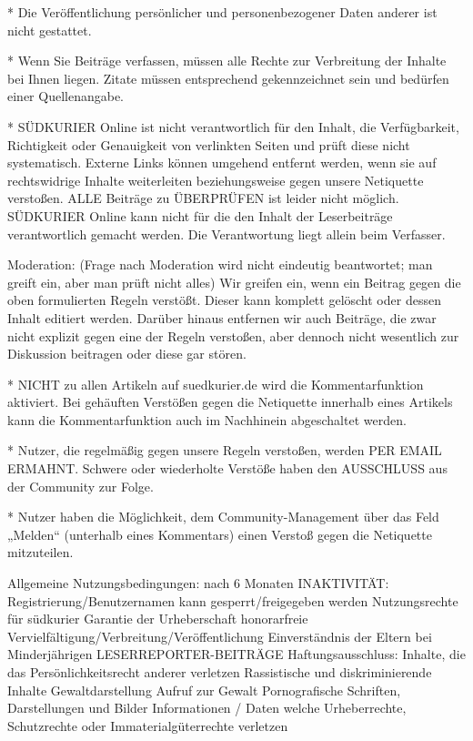* Die Veröffentlichung persönlicher und personenbezogener Daten anderer ist nicht gestattet.

* Wenn Sie Beiträge verfassen, müssen alle Rechte zur Verbreitung der Inhalte bei Ihnen liegen. Zitate müssen entsprechend gekennzeichnet sein und bedürfen einer Quellenangabe.

* SÜDKURIER Online ist nicht verantwortlich für den Inhalt, die Verfügbarkeit, Richtigkeit oder Genauigkeit von verlinkten Seiten und prüft diese nicht systematisch. Externe Links können umgehend entfernt werden, wenn sie auf rechtswidrige Inhalte weiterleiten beziehungsweise gegen unsere Netiquette verstoßen.
ALLE Beiträge zu ÜBERPRÜFEN ist leider nicht möglich. SÜDKURIER Online kann nicht für die den Inhalt der Leserbeiträge verantwortlich gemacht werden. Die Verantwortung liegt allein beim Verfasser.

Moderation: (Frage nach Moderation wird nicht eindeutig beantwortet; man greift ein, aber man prüft nicht alles)
Wir greifen ein, wenn ein Beitrag gegen die oben formulierten Regeln verstößt. Dieser kann komplett gelöscht oder dessen Inhalt editiert werden. Darüber hinaus entfernen wir auch Beiträge, die zwar nicht explizit gegen eine der Regeln verstoßen, aber dennoch nicht wesentlich zur Diskussion beitragen oder diese gar stören.

* NICHT zu allen Artikeln auf suedkurier.de wird die Kommentarfunktion aktiviert. Bei gehäuften Verstößen gegen die Netiquette innerhalb eines Artikels kann die Kommentarfunktion auch im Nachhinein abgeschaltet werden.

* Nutzer, die regelmäßig gegen unsere Regeln verstoßen, werden PER EMAIL ERMAHNT. Schwere oder wiederholte Verstöße haben den AUSSCHLUSS aus der Community zur Folge.

* Nutzer haben die Möglichkeit, dem Community-Management über das Feld „Melden“ (unterhalb eines Kommentars) einen Verstoß gegen die Netiquette mitzuteilen.


Allgemeine Nutzungsbedingungen:
nach 6 Monaten INAKTIVITÄT: Registrierung/Benutzernamen kann gesperrt/freigegeben werden
Nutzungsrechte für südkurier
Garantie der Urheberschaft
honorarfreie Vervielfältigung/Verbreitung/Veröffentlichung
Einverständnis der Eltern bei Minderjährigen
LESERREPORTER-BEITRÄGE
Haftungsausschluss: 
    Inhalte, die das Persönlichkeitsrecht anderer verletzen
    Rassistische und diskriminierende Inhalte
    Gewaltdarstellung
    Aufruf zur Gewalt
    Pornografische Schriften, Darstellungen und Bilder
    Informationen / Daten welche Urheberrechte, Schutzrechte oder Immaterialgüterrechte verletzen

